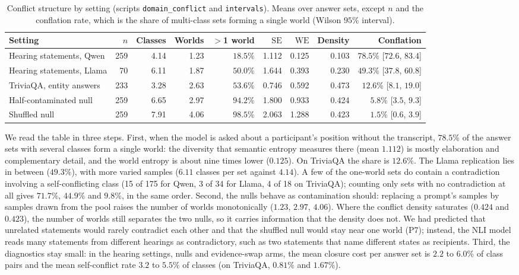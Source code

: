\documentclass[english]{desafiokunumi}
\theoremstyle{definition}
\theoremstyle{remark}
\newcommand{\SE}{\mathrm{SE}}
\newcommand{\WE}{\mathrm{WE}}
\begin{document}
\begin{table}[ht]
  \centering
  \caption{Conflict structure by setting (scripts \texttt{domain\_conflict} and \texttt{intervals}).
  Means over answer sets, except $n$ and the conflation rate, which is the
  share of multi-class sets forming a single world (Wilson $95\%$ interval).}
  \label{tab:conflacao}
  \small
  \setlength{\tabcolsep}{4pt}
  \begin{tabular}{@{}lrrrrrrrr@{}}
    \toprule
    \textbf{Setting} & $n$ & \textbf{Classes} & \textbf{Worlds} & $>$\textbf{1 world} & $\SE$ & $\WE$ & \textbf{Density} & \textbf{Conflation} \\
    \midrule
    Hearing statements, Qwen  & 259 & 4.14 & 1.23 & $18.5\%$ & 1.112 & 0.125 & 0.103 & $\mathbf{78.5\%}$ [$72.6$, $83.4$] \\
    Hearing statements, Llama & 70  & 6.11 & 1.87 & $50.0\%$ & 1.644 & 0.393 & 0.230 & $49.3\%$ [$37.8$, $60.8$] \\
    TriviaQA, entity answers  & 233 & 3.28 & 2.63 & $53.6\%$ & 0.746 & 0.592 & 0.473 & $\mathbf{12.6\%}$ [$8.1$, $19.0$] \\
    Half-contaminated null    & 259 & 6.65 & 2.97 & $94.2\%$ & 1.800 & 0.933 & 0.424 & $5.8\%$ [$3.5$, $9.3$] \\
    Shuffled null             & 259 & 7.91 & 4.06 & $98.5\%$ & 2.063 & 1.288 & 0.423 & $1.5\%$ [$0.6$, $3.9$] \\
    \bottomrule
  \end{tabular}
\end{table}

We read the table in three steps. First, when the model is asked about a
participant's position without the transcript, $78.5\%$ of the answer sets
with several classes form a single world: the diversity that semantic entropy
measures there (mean $1.112$) is mostly elaboration and complementary detail,
and the world entropy is about nine times lower ($0.125$). On TriviaQA the
share is $12.6\%$. The Llama replication lies in between ($49.3\%$), with
more varied samples ($6.11$ classes per set against $4.14$). A few of the
one-world sets do contain a contradiction involving a self-conflicting class
(15 of 175 for Qwen, 3 of 34 for Llama, 4 of 18 on TriviaQA); counting only
sets with no contradiction at all gives $71.7\%$, $44.9\%$ and $9.8\%$, in
the same order.
Second, the nulls behave as contamination should: replacing a prompt's
samples by samples drawn from the pool raises the number of worlds
monotonically ($1.23$, $2.97$, $4.06$). Where the conflict density saturates ($0.424$ and
$0.423$), the number of worlds still separates the two nulls, so it carries
information that the density does not. We had predicted that unrelated statements would rarely
contradict each other and that the shuffled null would stay near one world
(P7); instead, the NLI model reads many statements from different hearings as
contradictory, such as two statements that name different states as
recipients. Third, the diagnostics stay small: in the hearing settings, nulls
and evidence-swap arms, the mean closure cost per answer set is $2.2$ to
$6.0\%$ of class pairs and the mean self-conflict rate $3.2$ to $5.5\%$ of
classes (on TriviaQA, $0.81\%$ and $1.67\%$).
\end{document}

